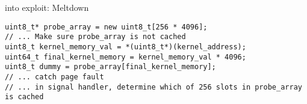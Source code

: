 
\begin{frame}[fragile]{into exploit: Meltdown}
\begin{Verbatim}[fontsize=\small]
uint8_t* probe_array = new uint8_t[256 * 4096];
// ... Make sure probe_array is not cached
uint8_t kernel_memory_val = *(uint8_t*)(kernel_address);
uint64_t final_kernel_memory = kernel_memory_val * 4096;
uint8_t dummy = probe_array[final_kernel_memory];
// ... catch page fault
// ... in signal handler, determine which of 256 slots in probe_array is cached
\end{Verbatim}
\end{frame}

